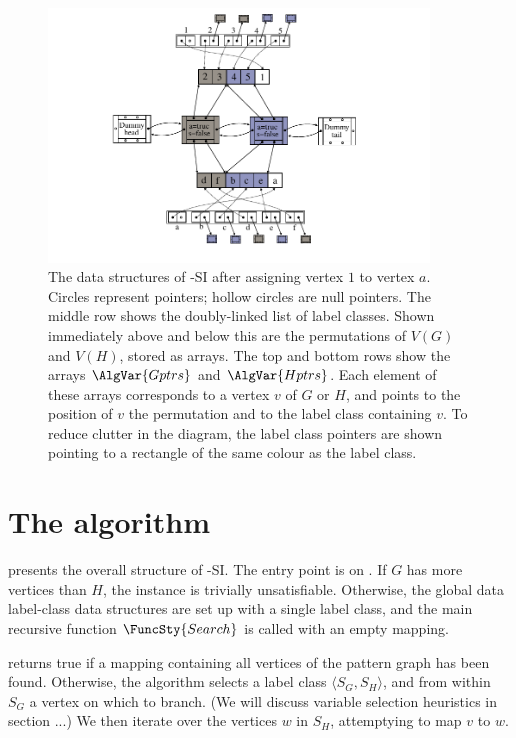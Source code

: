 \begin{figure}[htb]
    \centering
    \includegraphics*[width=0.9\textwidth]{14b-mcsplit-induced-si/figs/data-structure-step-1}
    \caption{The data structures of \McSplit-SI after assigning vertex $1$ to vertex $a$.
        Circles represent pointers; hollow circles are null pointers.  The middle row shows
        the doubly-linked list of label classes.  Shown immediately above and below this are the
        permutations of $V(G)$ and $V(H)$, stored as arrays.  The top and bottom rows
        show the arrays $\AlgVar{Gptrs}$ and $\AlgVar{Hptrs}$.  Each element of these arrays
        corresponds to a vertex $v$ of $G$ or $H$, and points to the position of $v$
        the permutation and to the label class containing $v$.  To reduce clutter in the diagram,
        the label class pointers are shown pointing to a rectangle of the same colour as the
        label class.}
    \label{figure:si-data-structures}
\end{figure}

\FloatBarrier

\section{The algorithm}

 presents the overall structure of \McSplit-SI.  The entry point is
on .  If $G$ has more vertices than $H$, the instance is trivially
unsatisfiable. Otherwise, the global data label-class data structures are set up with
a single label class, and the main recursive function $\FuncSty{Search}$ is called with
an empty mapping.

 returns true if a mapping containing all vertices of the
pattern graph has been found.  Otherwise, the algorithm selects a label class
$\langle S_G, S_H \rangle$, and from within $S_G$ a vertex on which to branch.
(We will discuss variable selection heuristics in section ...) We then iterate
over the vertices $w$ in $S_H$, attemptying to map $v$ to $w$.

